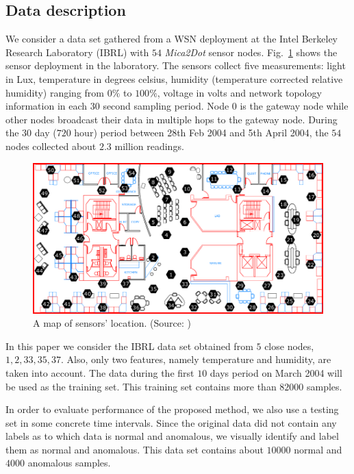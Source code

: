 \documentclass[conference]{IEEEtran}
\theoremstyle{problemstyle}
\begin{document}
\subsection{Data description}

We consider a data set gathered from a WSN deployment at the Intel Berkeley Research Laboratory (IBRL) \cite{Buonadonna2005} with $54$ \emph{Mica2Dot} sensor nodes. Fig.~\ref{fig:sensor_map} shows the sensor deployment in the laboratory. The sensors collect five measurements: light in Lux, temperature in degrees celsius, humidity (temperature corrected relative humidity) ranging from $0\%$ to $100\%$, voltage in volts and network topology information in each $30$ second sampling period. Node $0$ is the gateway node while other nodes broadcast their data in multiple hops to the gateway node. During the $30$ day ($720$ hour) period between 28th Feb 2004 and 5th April 2004, the $54$ nodes collected about $2.3$ million readings.

\begin{figure}[H]
\centering
\includegraphics[scale=.25]{Figs/ibrl_wsn.png}
\caption{A map of sensors' location. (Source: \cite{Buonadonna2005})}
\label{fig:sensor_map}
\end{figure}

In this paper we consider the IBRL data set obtained from $5$ close nodes, $1, 2, 33, 35, 37$. Also, only two features, namely temperature and humidity, are taken into account. The data during the first $10$ days period on March 2004 will be used as the training set. This training set contains more than $82000$ samples. 

In order to evaluate performance of the proposed method, we also use a testing set in some concrete time intervals. Since the original data did not contain any labels as to which data is normal and anomalous, we visually identify and label them as normal and anomalous. This data set contains about $10000$ normal and $4000$ anomalous samples.
\end{document}
